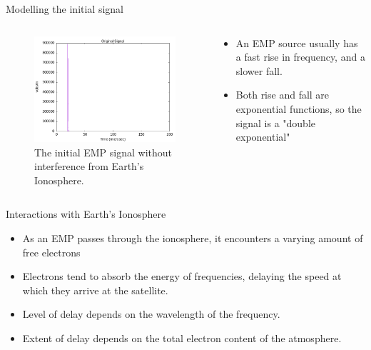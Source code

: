 \documentclass[10pt, aspectratio=168]{beamer}
\begin{document}
    \begin{frame}{Modelling the initial signal}
    \begin{columns}
    \begin{column}{0.4\textwidth}    
    \begin{figure}[h]
    \centering
    \includegraphics[width=1\textwidth]{emp_original_signal.png}
    \caption{The initial EMP signal without interference from Earth's Ionosphere.}
    \label{fig:emp_original_signal}
\end{figure}
\end{column}
    \begin{column}{0.4\textwidth}   
    \begin{itemize}
        \item \large An EMP source usually has a fast rise in frequency, and a slower fall.
        \vspace{0.5cm}
        \item Both rise and fall are exponential functions, so the signal is a "double exponential"
    \end{itemize}
    \end{column}
 \end{columns}

    \end{frame}
    
    \begin{frame}{Interactions with Earth's Ionosphere}
    \begin{itemize}
        \item \large As an EMP passes through the ionosphere, it encounters a varying amount of free electrons
        \item Electrons tend to absorb the energy of frequencies, delaying the speed at which they arrive at the satellite.
        \item Level of delay depends on the wavelength of the frequency.
        \item Extent of delay depends on the total electron content of the atmosphere.
    \end{itemize}
    \end{frame}
    
\end{document}
